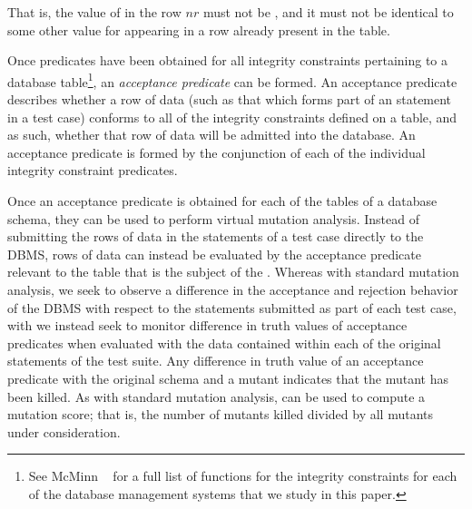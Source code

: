 \vspace{-.5em}
\begin{center}
\end{center}
\vspace{-.5em}

\noindent That is, the value of  in the row $nr$ must not
be \NULL, and it must not be identical to some other value for  appearing in a row already present in the table.



Once predicates have been obtained for all integrity constraints pertaining to a database table\footnote{{\scriptsize See McMinn \etal~\cite{McMinn2015} for a full list of functions for the integrity constraints for each of the database management systems that we study in this paper.}}, an {\it acceptance predicate} can be formed. An acceptance predicate describes whether a row of data (such as that which forms part of an \INSERT statement in a test case) conforms to all of the integrity constraints defined on a table, and as such, whether that row of data will be admitted into the database. An acceptance predicate is formed by the conjunction of each of the individual integrity constraint predicates.


 Once an acceptance predicate is obtained for each of the tables of a database schema, they can be used to perform virtual mutation analysis. Instead of submitting the rows of data in the \INSERT statements of a test case directly to the DBMS, rows of data can instead be evaluated by the acceptance predicate relevant to the table that is the subject of the \INSERT. Whereas with standard mutation analysis, we seek to observe a difference in the acceptance and rejection behavior of the DBMS with respect to the \INSERT statements submitted as part of each test case, with \vma we instead seek to monitor difference in truth values of acceptance predicates when evaluated with the data contained within each of the original \INSERT statements of the test suite. Any difference in truth value of an acceptance predicate with the original schema and a mutant indicates that the mutant has been killed. As with standard mutation analysis, \vma can be used to compute a mutation score; that is, the number of mutants killed divided by all mutants under consideration.

